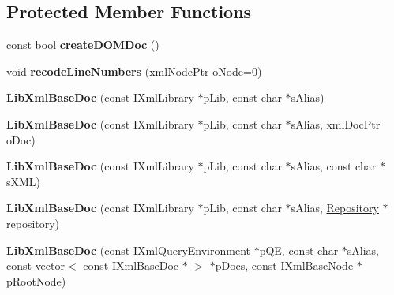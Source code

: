 \subsection*{\-Protected \-Member \-Functions}
\begin{DoxyCompactItemize}
\item 
\hypertarget{classgeneral__server_1_1LibXmlBaseDoc_acacd0eab944fe87df229fac4b575f607}{const bool {\bfseries create\-D\-O\-M\-Doc} ()}\label{classgeneral__server_1_1LibXmlBaseDoc_acacd0eab944fe87df229fac4b575f607}

\item 
\hypertarget{classgeneral__server_1_1LibXmlBaseDoc_a0cb5de8b9507b86e1c32adc355565973}{void {\bfseries recode\-Line\-Numbers} (xml\-Node\-Ptr o\-Node=0)}\label{classgeneral__server_1_1LibXmlBaseDoc_a0cb5de8b9507b86e1c32adc355565973}

\item 
\hypertarget{classgeneral__server_1_1LibXmlBaseDoc_aa5f7f19f74c032efa17829844155739a}{{\bfseries \-Lib\-Xml\-Base\-Doc} (const \-I\-Xml\-Library $\ast$p\-Lib, const char $\ast$s\-Alias)}\label{classgeneral__server_1_1LibXmlBaseDoc_aa5f7f19f74c032efa17829844155739a}

\item 
\hypertarget{classgeneral__server_1_1LibXmlBaseDoc_afbe5e2bb1abd0bf1995a5b54f260a0ee}{{\bfseries \-Lib\-Xml\-Base\-Doc} (const \-I\-Xml\-Library $\ast$p\-Lib, const char $\ast$s\-Alias, xml\-Doc\-Ptr o\-Doc)}\label{classgeneral__server_1_1LibXmlBaseDoc_afbe5e2bb1abd0bf1995a5b54f260a0ee}

\item 
\hypertarget{classgeneral__server_1_1LibXmlBaseDoc_a3d436a67b7a4632a9331e6eba9bac514}{{\bfseries \-Lib\-Xml\-Base\-Doc} (const \-I\-Xml\-Library $\ast$p\-Lib, const char $\ast$s\-Alias, const char $\ast$s\-X\-M\-L)}\label{classgeneral__server_1_1LibXmlBaseDoc_a3d436a67b7a4632a9331e6eba9bac514}

\item 
\hypertarget{classgeneral__server_1_1LibXmlBaseDoc_ac1686732b79e6c416092848ce43314cf}{{\bfseries \-Lib\-Xml\-Base\-Doc} (const \-I\-Xml\-Library $\ast$p\-Lib, const char $\ast$s\-Alias, \hyperlink{classgeneral__server_1_1Repository}{\-Repository} $\ast$repository)}\label{classgeneral__server_1_1LibXmlBaseDoc_ac1686732b79e6c416092848ce43314cf}

\item 
\hypertarget{classgeneral__server_1_1LibXmlBaseDoc_a3e82894955cd1afd5549606eac914c5d}{{\bfseries \-Lib\-Xml\-Base\-Doc} (const \-I\-Xml\-Query\-Environment $\ast$p\-Q\-E, const char $\ast$s\-Alias, const \hyperlink{classvector}{vector}$<$ const \-I\-Xml\-Base\-Doc $\ast$ $>$ $\ast$p\-Docs, const \-I\-Xml\-Base\-Node $\ast$p\-Root\-Node)}\label{classgeneral__server_1_1LibXmlBaseDoc_a3e82894955cd1afd5549606eac914c5d}


\end{DoxyCompactItemize}
